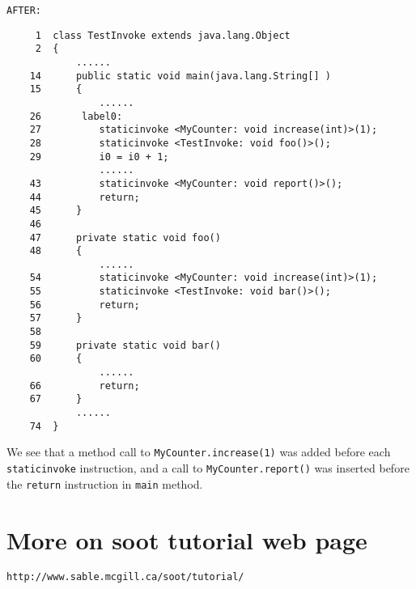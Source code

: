 \documentclass[12pt]{article}
\begin{document}
\noindent
{\tt AFTER:}
\begin{verbatim}
     1  class TestInvoke extends java.lang.Object
     2  {
            ......
    14      public static void main(java.lang.String[] )
    15      {
                ......
    26       label0:
    27          staticinvoke <MyCounter: void increase(int)>(1);
    28          staticinvoke <TestInvoke: void foo()>();
    29          i0 = i0 + 1;
                ......
    43          staticinvoke <MyCounter: void report()>();
    44          return;
    45      }
    46
    47      private static void foo()
    48      {
                ......
    54          staticinvoke <MyCounter: void increase(int)>(1);
    55          staticinvoke <TestInvoke: void bar()>();
    56          return;
    57      }
    58
    59      private static void bar()
    60      {
                ......
    66          return;
    67      }
            ......
    74  }
\end{verbatim}

\noindent
We see that a method call to {\tt MyCounter.increase(1)} was added before
each {\tt staticinvoke} instruction, and a call to {\tt MyCounter.report()}
was inserted before the {\tt return} instruction in {\tt main} method.

\section{More on soot tutorial web page}
{\tt http://www.sable.mcgill.ca/soot/tutorial/}
\end{document}
